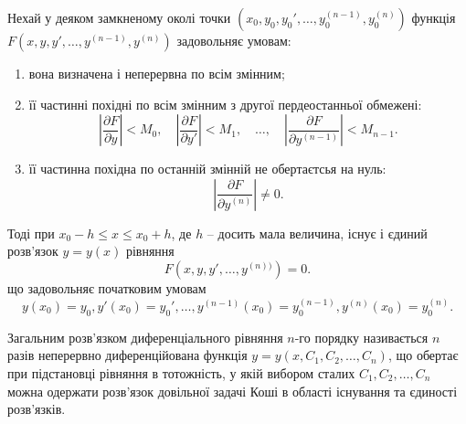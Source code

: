 \begin{theorem}
	Нехай у деяком замкненому околі точки $\left(x_0, y_0, y_0', \ldots, y_0^{(n-1)}, y_0^{(n)}\right)$ функція $F\left(x,y,y',\ldots,y^{(n-1)},y^{(n)}\right)$ задовольняє умовам:
	\begin{enumerate}
		\item вона визначена і неперервна по всім змінним;
		\item її частинні похідні по всім змінним з другої пердеостанньої обмежені:
		\begin{equation*}
			\left|\frac{\partial F}{\partial y}\right| < M_0, \quad \left|\frac{\partial F}{\partial y'}\right| < M_1, \quad \ldots, \quad \left|\frac{\partial F}{\partial y^{(n-1)}}\right| < M_{n-1}.
		\end{equation*}
		\item її частинна похідна по останній змінній не обертаєтсья на нуль: \[\left|\frac{\partial F}{\partial y^{(n)}}\right|\ne0.\]
	\end{enumerate}
	Тоді при $x_0 - h \le x \le x_0 + h$, де $h$ -- досить мала величина, існує і єдиний розв’язок $y=y(x)$ рівняння
    \begin{equation*}
    	F \left( x, y, y', \ldots, y^{(n))} \right) = 0.
    \end{equation*}
    що задовольняє початковим умовам
    \begin{equation*}
    	y(x_0) = y_0, y'(x_0) = y_0', \ldots, y^{(n - 1)} (x_0) = y_0^{(n-1)}, y^{(n)} (x_0) = y_0^{(n)}.
    \end{equation*}
\end{theorem}
\begin{definition}
	Загальним розв’язком диференціального рівняння $n$-го порядку називається $n$ разів неперервно диференційована функція $y=y(x,C_1,C_2,\ldots,C_n)$, що обертає при підстановці рівняння в тотожність, у якій вибором сталих $C_1, C_2, \ldots, C_n$ можна одержати розв’язок довільної задачі Коші в області існування та єдиності розв’язків.
\end{definition}

